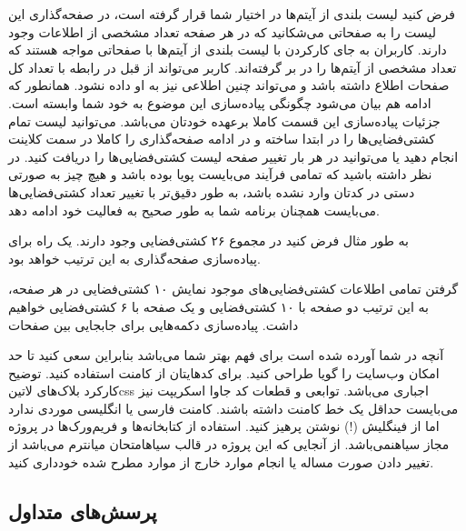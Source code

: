 \documentclass[../main.tex]{subfiles}
\begin{document}
فرض کنید لیست بلندی از آیتم‌ها در اختیار شما قرار گرفته است، در صفحه‌گذاری این لیست را به صفحاتی می‌شکانید که در هر صفحه تعداد مشخصی از اطلاعات وجود دارند. کاربران به جای کارکردن با لیست بلندی از آیتم‌ها با صفحاتی مواجه هستند که تعداد مشخصی از آیتم‌ها را در بر گرفته‌اند. کاربر می‌تواند از قبل در رابطه با تعداد کل صفحات اطلاع داشته باشد و می‌تواند چنین اطلاعی نیز به او داده نشود. همانطور که ادامه هم بیان می‌شود چگونگی پیاده‌سازی این موضوع به خود شما وابسته است.
جزئیات پیاده‌سازی این قسمت کاملا برعهده خودتان می‌باشد.
می‌توانید لیست تمام کشتی‌فضایی‌ها را در ابتدا ساخته و در ادامه صفحه‌گذاری را کاملا در سمت کلاینت انجام دهید یا می‌توانید در هر بار تغییر صفحه لیست کشتی‌فضایی‌ها را دریافت کنید.
در نظر داشته باشید که تمامی فرآیند می‌بایست پویا بوده باشد و هیچ چیز به صورتی دستی در کدتان وارد نشده باشد، به طور دقیق‌تر با تغییر تعداد کشتی‌فضایی‌ها می‌بایست همچنان برنامه شما به طور صحیح به فعالیت خود ادامه دهد.

به طور مثال فرض کنید در مجموع ۲۶ کشتی‌فضایی وجود دارند. یک راه برای پیاده‌سازی صفحه‌گذاری به این ترتیب خواهد بود.

   گرفتن تمامی اطلاعات کشتی‌فضایی‌های موجود
   نمایش ۱۰ کشتی‌فضایی در هر صفحه، به این ترتیب دو صفحه با ۱۰ کشتی‌فضایی و یک صفحه با ۶ کشتی‌فضایی خواهیم داشت.
   پیاده‌سازی دکمه‌هایی برای جابجایی بین صفحات


 آنچه در شما آورده شده است برای فهم بهتر شما می‌باشد بنابراین سعی کنید تا حد امکان وب‌سایت را گویا طراحی کنید.
 برای کدهایتان از کامنت استفاده کنید. توضیح کارکرد بلاک‌های ‌لاتین{css} اجباری می‌باشد. توابعی و قطعات کد جاوا اسکریپت نیز می‌بایست حداقل یک خط کامنت داشته باشند.
 کامنت فارسی یا انگلیسی موردی ندارد اما از فینگلیش (!) نوشتن پرهیز کنید.
 استفاده از کتابخانه‌ها و فریم‌ورک‌ها در پروژه مجاز ‌سیاه{نمی‌باشد}.
 از آنجایی که این پروژه در قالب ‌سیاه{امتحان میانترم} می‌باشد از تغییر دادن صورت مساله یا انجام موارد خارج از موارد مطرح شده خودداری کنید.

\subsection{پرسش‌های متداول}
\end{document}
